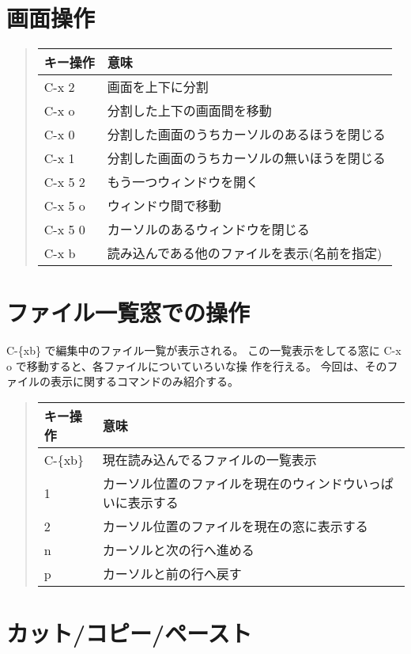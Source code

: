 \documentclass{jreport}
\begin{document}
\section{画面操作\label{sec:emacs.screen}}

\begin{quote}
\begin{tabular}[t]{ll}\hline
キー操作 & 意味 \\ \hline
C-x 2 & 画面を上下に分割 \\
C-x o & 分割した上下の画面間を移動 \\
C-x 0 & 分割した画面のうちカーソルのあるほうを閉じる \\
C-x 1 & 分割した画面のうちカーソルの無いほうを閉じる \\
C-x 5 2 & もう一つウィンドウを開く \\
C-x 5 o & ウィンドウ間で移動 \\
C-x 5 0 & カーソルのあるウィンドウを閉じる \\
C-x b & 読み込んである他のファイルを表示(名前を指定) \\
\hline
\end{tabular}
\end{quote}

\section{ファイル一覧窓での操作}

C-\{xb\} で編集中のファイル一覧が表示される。
この一覧表示をしてる窓に C-x o で移動すると、各ファイルについていろいな操
作を行える。
今回は、そのファイルの表示に関するコマンドのみ紹介する。

\begin{quote}
\begin{tabular}[t]{ll}\hline
キー操作 & 意味 \\ \hline
C-\{xb\} & 現在読み込んでるファイルの一覧表示\\
1 & カーソル位置のファイルを現在のウィンドウいっぱいに表示する\\
2& カーソル位置のファイルを現在の窓に表示する\\
n & カーソルと次の行へ進める\\
p & カーソルと前の行へ戻す\\
\hline
\end{tabular}
\end{quote}

\section{カット/コピー/ペースト}
\end{document}
